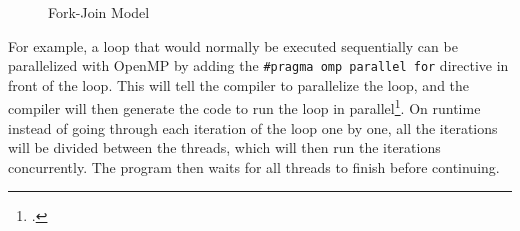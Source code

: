 \begin{figure}[!ht]
  \centering
  \caption{Fork-Join Model}
  \label{fig:fork_join}
\end{figure}
For example, a loop that would normally be executed sequentially can be parallelized with OpenMP
by adding the \texttt{\#pragma omp parallel for} directive in front of the loop.
This will tell the compiler to parallelize the loop, and the compiler will then generate the code to run the loop in parallel\footcite{mitplasmascienceandfusioncenterIntroParallelProgramming2022}.
On runtime instead of going through each iteration of the loop one by one,
all the iterations will be divided between the threads, which will then run the iterations concurrently.
The program then waits for all threads to finish before continuing.


